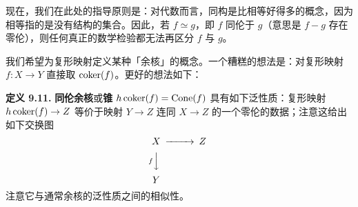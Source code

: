 现在，我们在此处的指导原则是：对代数而言，同构是比相等好得多的概念，因为相等指的是没有结构的集合。因此，若 $f\simeq g$，即 $f$ 同伦于 $g$（意思是 $f-g$ 存在零伦），则任何真正的数学检验都无法再区分 $f$ 与 $g$。

我们希望为复形映射定义某种「余核」的概念。一个糟糕的想法是：对复形映射 $f:X\to Y$ 直接取 $\operatorname{coker}(f)$。更好的想法如下：

\textbf{定义 9.11.} \textbf{同伦余核}或\textbf{锥} $h\operatorname{coker}(f)=\operatorname{Cone}(f)$ 具有如下泛性质：复形映射 $h\operatorname{coker}(f)\to Z$ 等价于映射 $Y\to Z$ 连同 $X\to Z$ 的一个零伦的数据；注意这给出如下交换图
\[
\begin{CD}
X @>>> Z\\
@V{f}VV @.\\
Y @.
\end{CD}
\]
注意它与通常余核的泛性质之间的相似性。
